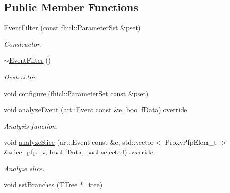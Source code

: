\subsection*{Public Member Functions}
\begin{DoxyCompactItemize}
\item 
\hyperlink{classanalysis_1_1EventFilter_a7124399b523bc4ec328ca75c8a3ec6a2}{Event\+Filter} (const fhicl\+::\+Parameter\+Set \&pset)
\begin{DoxyCompactList}\small\item\em Constructor. \end{DoxyCompactList}\item 
\hyperlink{classanalysis_1_1EventFilter_acc52a30ff7c1798ec736dae1956338a4}{$\sim$\+Event\+Filter} ()\hypertarget{classanalysis_1_1EventFilter_acc52a30ff7c1798ec736dae1956338a4}{}\label{classanalysis_1_1EventFilter_acc52a30ff7c1798ec736dae1956338a4}

\begin{DoxyCompactList}\small\item\em Destructor. \end{DoxyCompactList}\item 
void \hyperlink{classanalysis_1_1EventFilter_a6dd2a57cc03f5cae10f2e022649bbf17}{configure} (fhicl\+::\+Parameter\+Set const \&pset)
\item 
void \hyperlink{classanalysis_1_1EventFilter_a9b5594fe8c33c425e53311c2164ecbe3}{analyze\+Event} (art\+::\+Event const \&e, bool f\+Data) override\hypertarget{classanalysis_1_1EventFilter_a9b5594fe8c33c425e53311c2164ecbe3}{}\label{classanalysis_1_1EventFilter_a9b5594fe8c33c425e53311c2164ecbe3}

\begin{DoxyCompactList}\small\item\em Analysis function. \end{DoxyCompactList}\item 
void \hyperlink{classanalysis_1_1EventFilter_adbb470adf00631e8fcc5e759e3271c11}{analyze\+Slice} (art\+::\+Event const \&e, std\+::vector$<$ Proxy\+Pfp\+Elem\+\_\+t $>$ \&slice\+\_\+pfp\+\_\+v, bool f\+Data, bool selected) override
\begin{DoxyCompactList}\small\item\em Analyze slice. \end{DoxyCompactList}\item 
void \hyperlink{classanalysis_1_1EventFilter_a6f56ca4bf4f28d01c1a2c040407b44a7}{set\+Branches} (T\+Tree $\ast$\+\_\+tree)\hypertarget{classanalysis_1_1EventFilter_a6f56ca4bf4f28d01c1a2c040407b44a7}{}\label{classanalysis_1_1EventFilter_a6f56ca4bf4f28d01c1a2c040407b44a7}


\end{DoxyCompactItemize}
